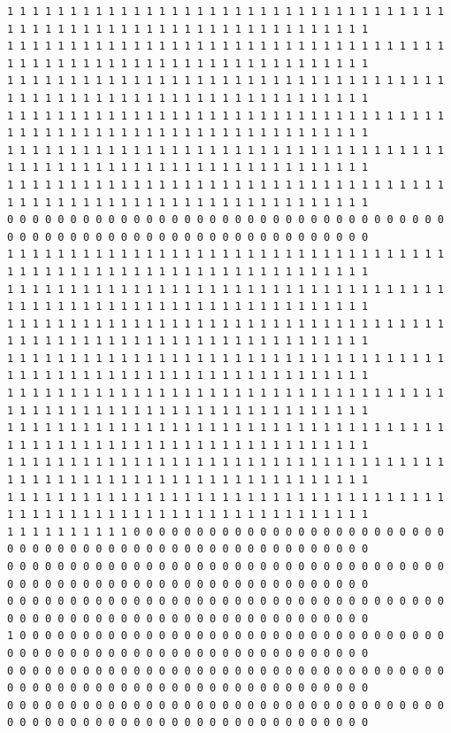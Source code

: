 \documentclass [10 pt, a4 paper]{report}
\begin{document}
\begin{lstlisting}[caption=Output of the simulation once it is finished, label={lst:code1}, frame=single]
1 1 1 1 1 1 1 1 1 1 1 1 1 1 1 1 1 1 1 1 1 1 1 1 1 1 1 1 1 1 1 1 1 1 1 1 1 1 1 1 1 1 1 1 1 1 1 1 1 1 1 1 1 1 1 1 1 1 1 1 1 1 1 1
1 1 1 1 1 1 1 1 1 1 1 1 1 1 1 1 1 1 1 1 1 1 1 1 1 1 1 1 1 1 1 1 1 1 1 1 1 1 1 1 1 1 1 1 1 1 1 1 1 1 1 1 1 1 1 1 1 1 1 1 1 1 1 1
1 1 1 1 1 1 1 1 1 1 1 1 1 1 1 1 1 1 1 1 1 1 1 1 1 1 1 1 1 1 1 1 1 1 1 1 1 1 1 1 1 1 1 1 1 1 1 1 1 1 1 1 1 1 1 1 1 1 1 1 1 1 1 1
1 1 1 1 1 1 1 1 1 1 1 1 1 1 1 1 1 1 1 1 1 1 1 1 1 1 1 1 1 1 1 1 1 1 1 1 1 1 1 1 1 1 1 1 1 1 1 1 1 1 1 1 1 1 1 1 1 1 1 1 1 1 1 1
1 1 1 1 1 1 1 1 1 1 1 1 1 1 1 1 1 1 1 1 1 1 1 1 1 1 1 1 1 1 1 1 1 1 1 1 1 1 1 1 1 1 1 1 1 1 1 1 1 1 1 1 1 1 1 1 1 1 1 1 1 1 1 1
1 1 1 1 1 1 1 1 1 1 1 1 1 1 1 1 1 1 1 1 1 1 1 1 1 1 1 1 1 1 1 1 1 1 1 1 1 1 1 1 1 1 1 1 1 1 1 1 1 1 1 1 1 1 1 1 1 1 1 1 1 1 1 1
0 0 0 0 0 0 0 0 0 0 0 0 0 0 0 0 0 0 0 0 0 0 0 0 0 0 0 0 0 0 0 0 0 0 0 0 0 0 0 0 0 0 0 0 0 0 0 0 0 0 0 0 0 0 0 0 0 0 0 0 0 0 0 0
1 1 1 1 1 1 1 1 1 1 1 1 1 1 1 1 1 1 1 1 1 1 1 1 1 1 1 1 1 1 1 1 1 1 1 1 1 1 1 1 1 1 1 1 1 1 1 1 1 1 1 1 1 1 1 1 1 1 1 1 1 1 1 1
1 1 1 1 1 1 1 1 1 1 1 1 1 1 1 1 1 1 1 1 1 1 1 1 1 1 1 1 1 1 1 1 1 1 1 1 1 1 1 1 1 1 1 1 1 1 1 1 1 1 1 1 1 1 1 1 1 1 1 1 1 1 1 1
1 1 1 1 1 1 1 1 1 1 1 1 1 1 1 1 1 1 1 1 1 1 1 1 1 1 1 1 1 1 1 1 1 1 1 1 1 1 1 1 1 1 1 1 1 1 1 1 1 1 1 1 1 1 1 1 1 1 1 1 1 1 1 1
1 1 1 1 1 1 1 1 1 1 1 1 1 1 1 1 1 1 1 1 1 1 1 1 1 1 1 1 1 1 1 1 1 1 1 1 1 1 1 1 1 1 1 1 1 1 1 1 1 1 1 1 1 1 1 1 1 1 1 1 1 1 1 1
1 1 1 1 1 1 1 1 1 1 1 1 1 1 1 1 1 1 1 1 1 1 1 1 1 1 1 1 1 1 1 1 1 1 1 1 1 1 1 1 1 1 1 1 1 1 1 1 1 1 1 1 1 1 1 1 1 1 1 1 1 1 1 1
1 1 1 1 1 1 1 1 1 1 1 1 1 1 1 1 1 1 1 1 1 1 1 1 1 1 1 1 1 1 1 1 1 1 1 1 1 1 1 1 1 1 1 1 1 1 1 1 1 1 1 1 1 1 1 1 1 1 1 1 1 1 1 1
1 1 1 1 1 1 1 1 1 1 1 1 1 1 1 1 1 1 1 1 1 1 1 1 1 1 1 1 1 1 1 1 1 1 1 1 1 1 1 1 1 1 1 1 1 1 1 1 1 1 1 1 1 1 1 1 1 1 1 1 1 1 1 1
1 1 1 1 1 1 1 1 1 1 1 1 1 1 1 1 1 1 1 1 1 1 1 1 1 1 1 1 1 1 1 1 1 1 1 1 1 1 1 1 1 1 1 1 1 1 1 1 1 1 1 1 1 1 1 1 1 1 1 1 1 1 1 1
1 1 1 1 1 1 1 1 1 1 0 0 0 0 0 0 0 0 0 0 0 0 0 0 0 0 0 0 0 0 0 0 0 0 0 0 0 0 0 0 0 0 0 0 0 0 0 0 0 0 0 0 0 0 0 0 0 0 0 0 0 0 0 0
0 0 0 0 0 0 0 0 0 0 0 0 0 0 0 0 0 0 0 0 0 0 0 0 0 0 0 0 0 0 0 0 0 0 0 0 0 0 0 0 0 0 0 0 0 0 0 0 0 0 0 0 0 0 0 0 0 0 0 0 0 0 0 0
0 0 0 0 0 0 0 0 0 0 0 0 0 0 0 0 0 0 0 0 0 0 0 0 0 0 0 0 0 0 0 0 0 0 0 0 0 0 0 0 0 0 0 0 0 0 0 0 0 0 0 0 0 0 0 0 0 0 0 0 0 0 0 0
1 0 0 0 0 0 0 0 0 0 0 0 0 0 0 0 0 0 0 0 0 0 0 0 0 0 0 0 0 0 0 0 0 0 0 0 0 0 0 0 0 0 0 0 0 0 0 0 0 0 0 0 0 0 0 0 0 0 0 0 0 0 0 0
0 0 0 0 0 0 0 0 0 0 0 0 0 0 0 0 0 0 0 0 0 0 0 0 0 0 0 0 0 0 0 0 0 0 0 0 0 0 0 0 0 0 0 0 0 0 0 0 0 0 0 0 0 0 0 0 0 0 0 0 0 0 0 0
0 0 0 0 0 0 0 0 0 0 0 0 0 0 0 0 0 0 0 0 0 0 0 0 0 0 0 0 0 0 0 0 0 0 0 0 0 0 0 0 0 0 0 0 0 0 0 0 0 0 0 0 0 0 0 0 0 0 0 0 0 0 0 0

\end{lstlisting}
\end{document}
